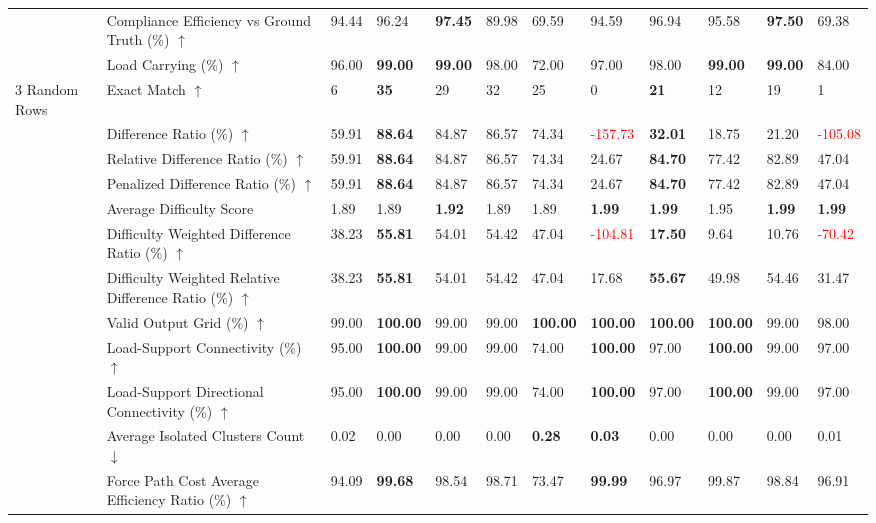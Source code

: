 \begin{table}[!h]
{\begin{tabular}{lllllll|lllll}
 & Compliance Efficiency vs Ground Truth (\%) $\uparrow$ & 94.44 & 96.24 & \textbf{97.45} & 89.98 & 69.59 & 94.59 & 96.94 & 95.58 & \textbf{97.50} & 69.38 \\
 & Load Carrying (\%) $\uparrow$ & 96.00 & \textbf{99.00} & \textbf{99.00} & 98.00 & 72.00 & 97.00 & 98.00 & \textbf{99.00} & \textbf{99.00} & 84.00 \\
\midrule
3 Random Rows & Exact Match $\uparrow$ & 6 & \textbf{35} & 29 & 32 & 25 & 0 & \textbf{21} & 12 & 19 & 1 \\
 & Difference Ratio (\%) $\uparrow$ & 59.91 & \textbf{88.64} & 84.87 & 86.57 & 74.34 & \textcolor{red}{-157.73} & \textbf{32.01} & 18.75 & 21.20 & \textcolor{red}{-105.08} \\
 & Relative Difference Ratio (\%) $\uparrow$ & 59.91 & \textbf{88.64} & 84.87 & 86.57 & 74.34 & 24.67 & \textbf{84.70} & 77.42 & 82.89 & 47.04 \\
 & Penalized Difference Ratio (\%) $\uparrow$ & 59.91 & \textbf{88.64} & 84.87 & 86.57 & 74.34 & 24.67 & \textbf{84.70} & 77.42 & 82.89 & 47.04 \\
 & Average Difficulty Score & 1.89 & 1.89 & \textbf{1.92} & 1.89 & 1.89 & \textbf{1.99} & \textbf{1.99} & 1.95 & \textbf{1.99} & \textbf{1.99} \\
 & Difficulty Weighted Difference Ratio (\%) $\uparrow$ & 38.23 & \textbf{55.81} & 54.01 & 54.42 & 47.04 & \textcolor{red}{-104.81} & \textbf{17.50} & 9.64 & 10.76 & \textcolor{red}{-70.42} \\
 & Difficulty Weighted Relative Difference Ratio (\%) $\uparrow$ & 38.23 & \textbf{55.81} & 54.01 & 54.42 & 47.04 & 17.68 & \textbf{55.67} & 49.98 & 54.46 & 31.47 \\
 & Valid Output Grid (\%) $\uparrow$ & 99.00 & \textbf{100.00} & 99.00 & 99.00 & \textbf{100.00} & \textbf{100.00} & \textbf{100.00} & \textbf{100.00} & 99.00 & 98.00 \\
 & Load-Support Connectivity (\%) $\uparrow$ & 95.00 & \textbf{100.00} & 99.00 & 99.00 & 74.00 & \textbf{100.00} & 97.00 & \textbf{100.00} & 99.00 & 97.00 \\
 & Load-Support Directional Connectivity (\%) $\uparrow$ & 95.00 & \textbf{100.00} & 99.00 & 99.00 & 74.00 & \textbf{100.00} & 97.00 & \textbf{100.00} & 99.00 & 97.00 \\
 & Average Isolated Clusters Count $\downarrow$ & 0.02 & 0.00 & 0.00 & 0.00 & \textbf{0.28} & \textbf{0.03} & 0.00 & 0.00 & 0.00 & 0.01 \\
 & Force Path Cost Average Efficiency Ratio (\%) $\uparrow$ & 94.09 & \textbf{99.68} & 98.54 & 98.71 & 73.47 & \textbf{99.99} & 96.97 & 99.87 & 98.84 & 96.91 \\

\end{tabular}}
\end{table}
